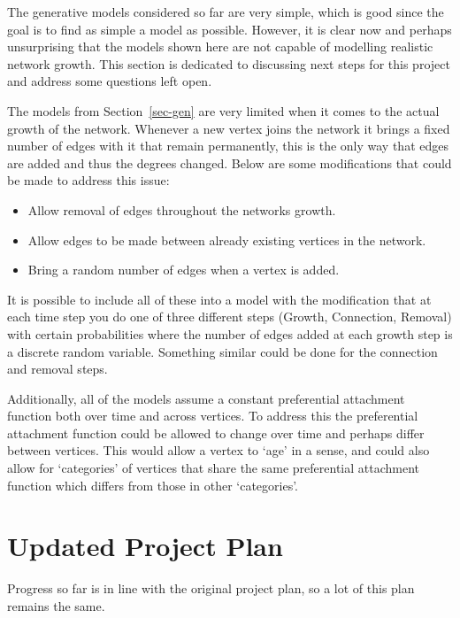 \documentclass[
  10pt,
  a4paper,
]{scrreprt}
\providecommand{\tightlist}{%
  \setlength{\itemsep}{0pt}\setlength{\parskip}{0pt}}\usepackage{longtable,booktabs,array}
\theoremstyle{definition}
\theoremstyle{plain}
\theoremstyle{plain}
\theoremstyle{remark}
\begin{document}
{The generative models considered so far are very simple, which is good
since the goal is to find as simple a model as possible. However, it is
clear now and perhaps unsurprising that the models shown here are not
capable of modelling realistic network growth. This section is dedicated
to discussing next steps for this project and address some questions
left open.

The models from Section~\ref{sec-gen} are very limited when it comes to
the actual growth of the network. Whenever a new vertex joins the
network it brings a fixed number of edges with it that remain
permanently, this is the only way that edges are added and thus the
degrees changed. Below are some modifications that could be made to
address this issue:

\begin{itemize}
\tightlist
\item
  Allow removal of edges throughout the networks growth.
\item
  Allow edges to be made between already existing vertices in the
  network.
\item
  Bring a random number of edges when a vertex is added.
\end{itemize}

It is possible to include all of these into a model with the
modification that at each time step you do one of three different steps
(Growth, Connection, Removal) with certain probabilities where the
number of edges added at each growth step is a discrete random variable.
Something similar could be done for the connection and removal steps.

Additionally, all of the models assume a constant preferential
attachment function both over time and across vertices. To address this
the preferential attachment function could be allowed to change over
time and perhaps differ between vertices. This would allow a vertex to
`age' in a sense, and could also allow for `categories' of vertices that
share the same preferential attachment function which differs from those
in other `categories'.

\appendix

\hypertarget{sec-plan}{%
\chapter{Updated Project Plan}\label{sec-plan}}

Progress so far is in line with the original project plan, so a lot of
this plan remains the same.

}
\end{document}
